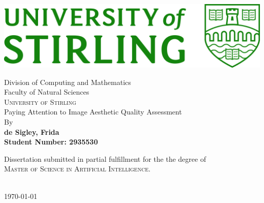 \begin{titlepage}
    
    \centering
    \includegraphics[width=0.4\linewidth]{logos/primary-logo.jpg}
    \begin{center}
        \vspace*{1cm}
          \vspace{10mm}
        {\large Division of Computing and Mathematics\\
        \large Faculty of Natural Sciences \\
        \textsc{University of Stirling}}
        \\
        \vspace{0.5cm}
        {\large
        Paying Attention to Image Aesthetic Quality Assessment}
        \vspace{0.5cm}
        \\
        {\large By}
        \\
        \vspace{0.5cm}
        \textbf{de Sigley, Frida}\\
        \vspace{0.5cm}
        \textbf{Student Number: 2935530}
   		\vspace{1.5cm}
        \vspace{0.25cm}
       \\
        \vspace{0.25cm}
    

      

        \vspace{0.8cm}
        \begin{minipage}{10cm}
        \center Dissertation submitted in partial fulfillment for the the degree of \\
        \textsc{Master of Science in Artificial Intelligence}.
        \end{minipage}\\
        \vspace{0.8cm}
        \today
        
    \end{center}
    
 

\end{titlepage}